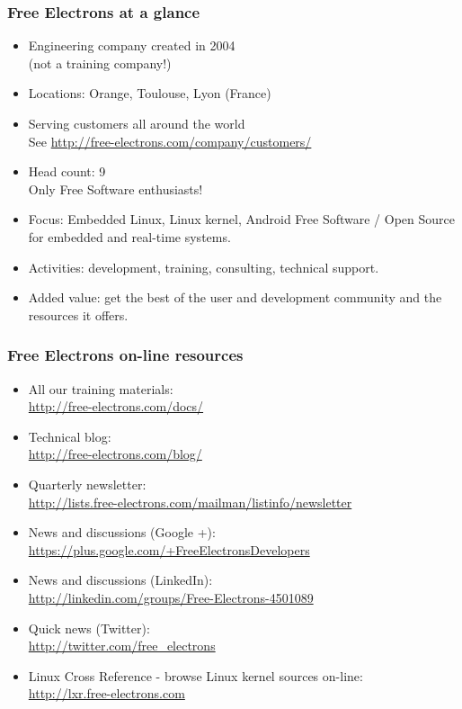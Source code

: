 \begin{frame}
\frametitle{Free Electrons at a glance}
  \begin{itemize}
    \item Engineering company created in 2004 \\
          (not a training company!)
    \item Locations: Orange, Toulouse, Lyon (France)
    \item Serving customers all around the world \\
          See \url{http://free-electrons.com/company/customers/}
    \item Head count: 9 \\
	  Only Free Software enthusiasts!
    \item Focus: Embedded Linux, Linux kernel, Android
          Free Software / Open Source
          for embedded and real-time systems.
    \item Activities: development, training, consulting, technical
          support.
    \item Added value: get the best of the user and development
          community and the resources it offers.
  \end{itemize}
\end{frame}

\begin{frame}
\frametitle{Free Electrons on-line resources}
  \begin{itemize}
    \item All our training materials:\\
          \url{http://free-electrons.com/docs/}
    \item Technical blog:\\
          \url{http://free-electrons.com/blog/}
    \item Quarterly newsletter:\\
 	  \url{http://lists.free-electrons.com/mailman/listinfo/newsletter}
    \item News and discussions (Google +):\\
	  \url{https://plus.google.com/+FreeElectronsDevelopers}
    \item News and discussions (LinkedIn):\\
	  \url{http://linkedin.com/groups/Free-Electrons-4501089}
    \item Quick news (Twitter):\\
          \url{http://twitter.com/free_electrons}
    \item Linux Cross Reference - browse Linux kernel sources on-line:\\
          \url{http://lxr.free-electrons.com}
  \end{itemize}
\end{frame}

